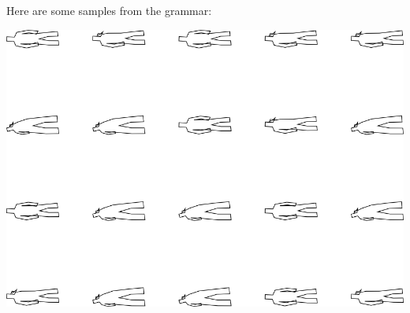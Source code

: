 Here are some samples from the grammar:

\includegraphics[width=6in]{output/3.learning/incremental/gram.2.d/samples.png}

